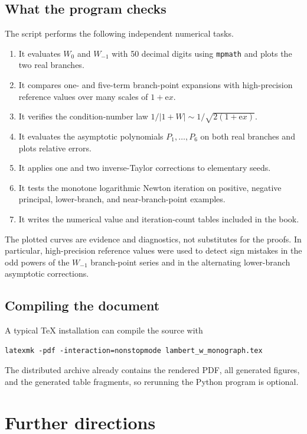 \documentclass[11pt,openany]{book}
\newcommand{\e}{\mathrm{e}}
\newcommand{\abs}[1]{\left|#1\right|}
\theoremstyle{plain}
\theoremstyle{definition}
\theoremstyle{remark}
\begin{document}
\section{What the program checks}
The script performs the following independent numerical tasks.
\begin{enumerate}[label=\arabic*.]
\item It evaluates \(W_0\) and \(W_{-1}\) with 50 decimal digits using
\texttt{mpmath} and plots the two real branches.
\item It compares one- and five-term branch-point expansions with high-precision
reference values over many scales of \(1+\e x\).
\item It verifies the condition-number law
\(1/\abs{1+W}\sim1/\sqrt{2(1+\e x)}\).
\item It evaluates the asymptotic polynomials \(P_1,\ldots,P_6\) on both real
branches and plots relative errors.
\item It applies one and two inverse-Taylor corrections to elementary seeds.
\item It tests the monotone logarithmic Newton iteration on positive, negative
principal, lower-branch, and near-branch-point examples.
\item It writes the numerical value and iteration-count tables included in the
book.
\end{enumerate}

The plotted curves are evidence and diagnostics, not substitutes for the
proofs.  In particular, high-precision reference values were used to detect
sign mistakes in the odd powers of the \(W_{-1}\) branch-point series and in
the alternating lower-branch asymptotic corrections.

\section{Compiling the document}
A typical TeX installation can compile the source with
\begin{verbatim}
latexmk -pdf -interaction=nonstopmode lambert_w_monograph.tex
\end{verbatim}
The distributed archive already contains the rendered PDF, all generated
figures, and the generated table fragments, so rerunning the Python program is
optional.

\chapter{Further directions}\label{app:further}
\end{document}
